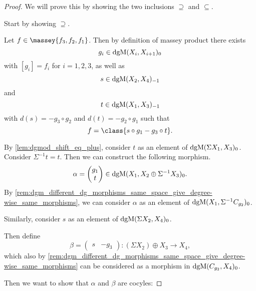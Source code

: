 \begin{proof}
    We will prove this by showing the two inclusions \( \supseteq \) and \( \subseteq \).

    Start by showing \( \supseteq \).

    Let \( f \in \massey{f_3, f_2, f_1} \). Then by definition of massey product there exists
    \[
        g_i \in \operatorname{dgM}(X_i, X_{i + 1})_0
    \]
    with \( [g_i] = f_i \) for \( i = 1, 2, 3 \), as well as
    \[
        s \in \operatorname{dgM}(X_2, X_4)_{-1}
    \]
    and
    \[
        t \in \operatorname{dgM}(X_1, X_3)_{-1}
    \]
    with \( d(s) = - g_3 \circ g_2 \) and \( d(t) = - g_2 \circ g_1 \) such that
    \[
        f = \class{s \circ g_1 - g_3 \circ t}.
    \]

    By \autoref{lem:dgmod_shift_eq_plus}, consider \( t \) as an element of \( \operatorname{dgM}(\Sigma X_1, X_3)_0 \). Consider \( \Sigma^{-1} t = t \). Then we can construct the following morphism.
    \[
        \alpha =
        \begin{pmatrix}
            g_1 \\
            t
        \end{pmatrix}
        \in \operatorname{dgM}(X_1, X_2 \oplus \Sigma^{-1} X_3)_0.
    \]
    By \autoref{rem:dgm_different_dg_morphisms_same_space_give_degree-wise_same_morphisms}, we can consider \( \alpha \) as an element of \( \operatorname{dgM}(X_1, \Sigma^{-1} C_{g_2})_0 \).

    Similarly, consider \( s \) as an element of \( \operatorname{dgM}(\Sigma X_2, X_4)_0 \).

    Then define
    \[
        \beta =
        \begin{pmatrix}
            s & -g_3
        \end{pmatrix}
        : (\Sigma X_2) \oplus X_3 \to X_4,
    \]
    which also by \autoref{rem:dgm_different_dg_morphisms_same_space_give_degree-wise_same_morphisms} can be considered as a morphism in \( \operatorname{dgM}(C_{g_2}, X_4)_0 \).

    Then we want to show that \( \alpha \) and \( \beta \) are cocyles:


\end{proof}
